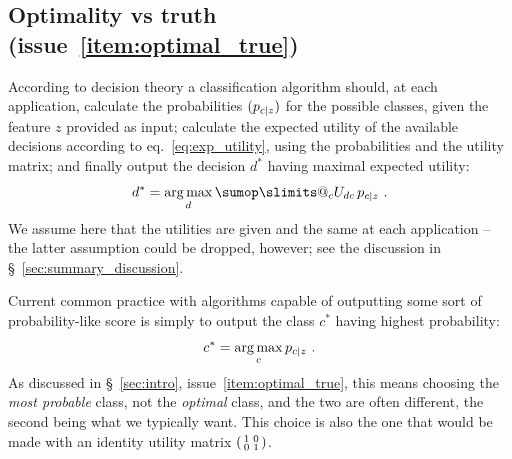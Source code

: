 \documentclass[\ifafour a4paper,12pt,\else a5paper,10pt,\fi%
onecolumn,oneside,article,%
british%
]{memoir}
\makeatletter
\theoremstyle{remark}
\theoremstyle{innote}
\def\sum{\DOTSI\sumop\slimits@}
\renewcommand*{\|}[1][]{\nonscript\:#1\vert\nonscript\:\mathopen{}}
\newcommand*{\sect}{\S}%
\newcommand*{\eqn}{eq.}%
\newcommand*{\puzzle}{{\fontencoding{U}\fontfamily{fontawesometwo}\selectfont\symbol{225}}}
\newcommand{\mynote}[1]{ {\color{notecolour}#1}}
\DeclareMathOperator*{\argmax}{arg\,max}
\newcommand*{\Po}{\mathord{+}}
\newcommand*{\Ne}{\mathord{-}}
\newcommand*{\tp}{\textrm{tp}}
\newcommand*{\fp}{\textrm{fp}}
\newcommand*{\itemno}{{\fontencoding{U}\fontfamily{pzd}\selectfont\symbol{55}}}
\makeatother
\begin{document}







\subsection{Optimality vs truth (issue~\ref{item:optimal_true})}
\label{sec:optimality_truth}

According to decision theory a classification algorithm should, at each application, calculate the probabilities $(p_{c\|z})$ for the possible classes, given the feature $z$ provided as input; calculate the expected utility of the available decisions according to \eqn~\eqref{eq:exp_utility}, using the probabilities and the utility matrix; and finally output the decision $d^{*}$ having maximal expected utility:
\begin{equation}
  \label{eq:argmax_decision}
  d^{*} = \argmax_{d}   \sum_{c} U_{dc}\, p_{c\|z} \ .
\end{equation}
We assume here that the utilities are given and the same at each application -- the latter assumption could be dropped, however; see the discussion in \sect~\ref{sec:summary_discussion}.

Current common practice with algorithms capable of outputting some sort of probability-like score is simply to output the class $c^{*}$ having highest probability:
\begin{equation}
  \label{eq:argmax_probable}
  c^{*} = \argmax_{c} p_{c\|z} \ .
\end{equation}
As discussed in \sect~\ref{sec:intro}, issue~\ref{item:optimal_true}, this means choosing the \emph{most probable} class, not the \emph{optimal} class, and the two are often different, the second being what we typically want. This choice is also the one that would be made with an identity utility matrix $\begin{psmallmatrix} 1&0\\0&1 \end{psmallmatrix}$.
\end{document}
